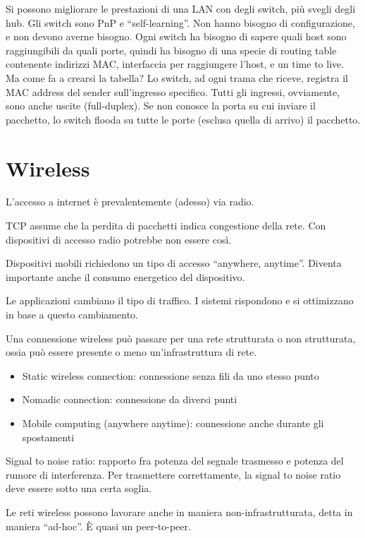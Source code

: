 Si possono migliorare le prestazioni di una LAN con degli switch, pi\`u svegli degli hub. Gli switch sono PnP e ``self-learning''. Non hanno bisogno di configurazione, e non devono averne bisogno. Ogni switch ha bisogno di sapere quali host sono raggiungibili da quali porte, quindi ha bisogno di una specie di routing table contenente indirizzi MAC, interfaccia per raggiungere l'host, e un time to live. Ma come fa a crearsi la tabella? Lo switch, ad ogni trama che riceve, registra il MAC address del sender sull'ingresso specifico. Tutti gli ingressi, ovviamente, sono anche uscite (full-duplex). Se non conosce la porta su cui inviare il pacchetto, lo switch flooda su tutte le porte (esclusa quella di arrivo) il pacchetto. 

\section{Wireless}

L'accesso a internet \`e prevalentemente (adesso) via radio.

TCP assume che la perdita di pacchetti indica congestione della rete. Con dispositivi di accesso radio potrebbe non essere cos\`i.

Dispositivi mobili richiedono un tipo di accesso ``anywhere, anytime''. Diventa importante anche il consumo energetico del dispositivo.

Le applicazioni cambiano il tipo di traffico. I sistemi rispondono e si ottimizzano in base a questo cambiamento.

Una connessione wireless pu\`o passare per una rete strutturata o non strutturata, ossia pu\`o essere presente o meno un'infrastruttura di rete.

\begin{itemize}
    \item Static wireless connection: connessione senza fili da uno stesso punto
    \item Nomadic connection: connessione da diversi punti
    \item Mobile computing (anywhere anytime): connessione anche durante gli spostamenti
\end{itemize}

Signal to noise ratio: rapporto fra potenza del segnale trasmesso e potenza del rumore di interferenza. Per trasmettere correttamente, la signal to noise ratio deve essere sotto una certa soglia.

Le reti wireless possono lavorare anche in maniera non-infrastrutturata, detta in maniera ``ad-hoc''. \`E quasi un peer-to-peer.

